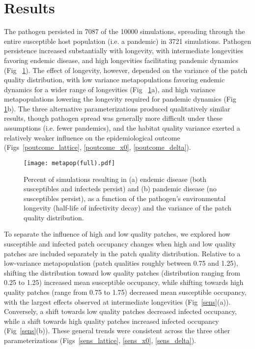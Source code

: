 \documentclass{svjour3}
\begin{document}
\section{Results}
\label{results}

The pathogen persisted in 7087 of the 10000 simulations, spreading through the entire susceptible host population (i.e. a pandemic) in 3721 simulations.  Pathogen persistence increased substantially with longevity, with intermediate longevities favoring endemic disease, and high longevities facilitating pandemic dynamics (Fig~ \ref{poutcome}).  The effect of longevity, however, depended on the variance of the patch quality distribution, with low variance metapopulations favoring endemic dynamics for a wider range of longevities (Fig~ \ref{poutcome}a), and high variance metapopulations lowering the longevity required for pandemic dynamics (Fig~ \ref{poutcome}b).  The three alternative parameterizations produced qualitatively similar results, though pathogen spread was generally more difficult under these assumptions (i.e. fewer pandemics), and the habitat quality variance exerted a relatively weaker influence on the epidemiological outcome (Figs~\ref{poutcome_lattice}, \ref{poutcome_x0}, \ref{poutcome_delta}).

\begin{figure}
\centering
\texttt{[image: metapop(full).pdf]}
\caption{Percent of simulations resulting in (a) endemic disease (both susceptibles and infecteds persist) and (b) pandemic disease (no susceptibles persist), as a function of the pathogen's environmental longevity (half-life of infectivity decay) and the variance of the patch quality distribution.}
\label{poutcome}
\end{figure}   

To separate the influence of high and low quality patches, we explored how susceptible and infected patch occupancy changes when high and low quality patches are included separately in the patch quality distribution.  Relative to a low-variance metapopulation (patch qualities roughly between 0.75 and 1.25), shifting the distribution toward low quality patches (distribution ranging from 0.25 to 1.25) increased mean susceptible occupancy, while shifting towards high quality patches (range from 0.75 to 1.75) decreased mean susceptible occupancy, with the largest effects observed at intermediate longevities (Fig~\ref{sens}(a)).  Conversely, a shift towards low quality patches decreased infected occupancy, while a shift towards high quality patches increased infected occupancy (Fig~\ref{sens}(b)).  These general trends were consistent across the three other parameterizations (Figs~\ref{sens_lattice}, \ref{sens_x0}, \ref{sens_delta}).  
\end{document}
